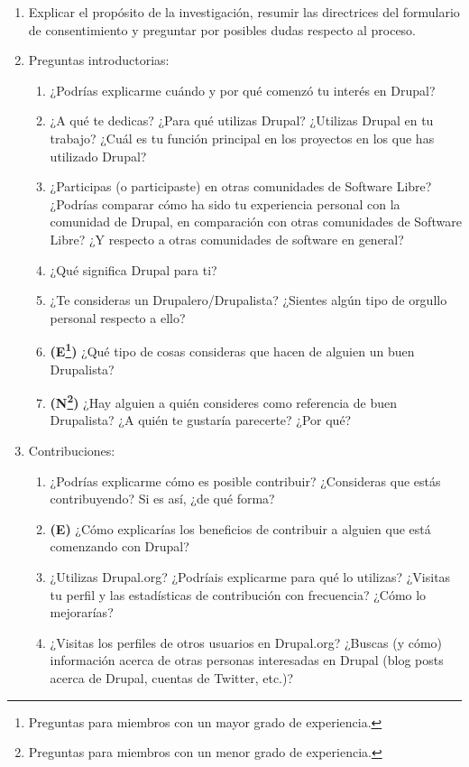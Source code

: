 \begin{enumerate}
	\item Explicar el propósito de la investigación, resumir las directrices del formulario de consentimiento y preguntar por posibles dudas respecto al proceso.
	\item Preguntas introductorias:
		\begin{enumerate}
			\item ¿Podrías explicarme cuándo y por qué comenzó tu interés en Drupal?
			\item ¿A qué te dedicas? ¿Para qué utilizas Drupal? ¿Utilizas Drupal en tu trabajo? ¿Cuál es tu función principal en los proyectos en los que has utilizado Drupal?
			\item ¿Participas (o participaste) en otras comunidades de Software Libre? ¿Podrías comparar cómo ha sido tu experiencia personal con la comunidad de Drupal, en comparación con otras comunidades de Software Libre? ¿Y respecto a otras comunidades de software en general?
			\item ¿Qué significa Drupal para ti?
			\item ¿Te consideras un Drupalero\slash Drupalista? ¿Sientes algún tipo de orgullo personal respecto a ello?
			\item \textbf{(E\footnote{Preguntas para miembros con un mayor grado de experiencia.})} ¿Qué tipo de cosas consideras que hacen de alguien un buen Drupalista?
			\item \textbf{(N\footnote{Preguntas para miembros con un menor grado de experiencia.})} ¿Hay alguien a quién consideres como referencia de buen Drupalista? ¿A quién te gustaría parecerte? ¿Por qué?
		\end{enumerate}
	\item Contribuciones:
		\begin{enumerate}
			\item ¿Podrías explicarme cómo es posible contribuir? ¿Consideras que estás contribuyendo? Si es así, ¿de qué forma?
			\item \textbf{(E)} ¿Cómo explicarías los beneficios de contribuir a alguien que está comenzando con Drupal?
			\item ¿Utilizas Drupal.org? ¿Podríais explicarme para qué lo utilizas? ¿Visitas tu perfil y las estadísticas de contribución con frecuencia? ¿Cómo lo mejorarías? 
			\item ¿Visitas los perfiles de otros usuarios en Drupal.org? ¿Buscas (y cómo) información acerca de otras personas interesadas en Drupal (blog posts acerca de Drupal, cuentas de Twitter, etc.)?

\end{enumerate}
\end{enumerate}
